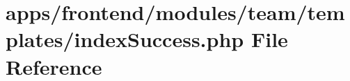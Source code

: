 \hypertarget{frontend_2modules_2team_2templates_2index_success_8php}{\section{apps/frontend/modules/team/templates/index\-Success.php File Reference}
\label{frontend_2modules_2team_2templates_2index_success_8php}
}

